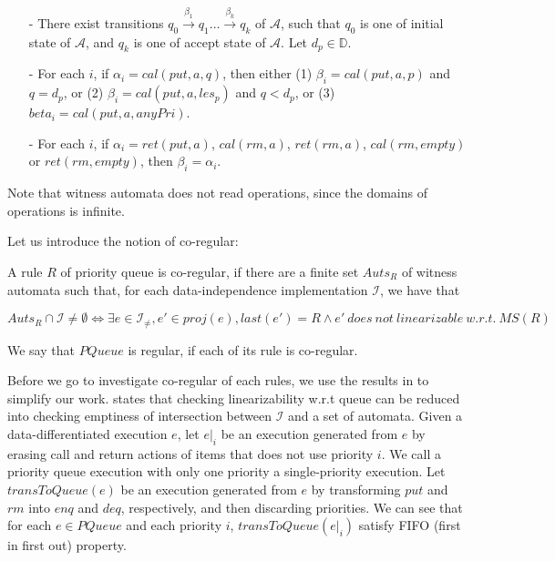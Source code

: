 \begin{itemize}
\setlength{\itemsep}{0.5pt}
\item[-] There exist transitions $q_0 \xrightarrow{\beta_1} q_1 \ldots \xrightarrow{\beta_k} q_k$ of $\mathcal{A}$, such that $q_0$ is one of initial state of $\mathcal{A}$, and $q_k$ is one of accept state of $\mathcal{A}$. Let $d_p \in \mathbb{D}$.

\item[-] For each $i$, if $\alpha_i = \textit{cal}(\textit{put},a,q)$, then either (1) $\beta_i = \textit{cal}(\textit{put},a,p)$ and $q = d_p$, or (2) $\beta_i = \textit{cal}(\textit{put},a,\textit{les}_p)$ and $q < d_p$, or (3) $beta_i = \textit{cal}(\textit{put},a,\textit{anyPri})$.

\item[-] For each $i$, if $\alpha_i = \textit{ret}(\textit{put},a)$, $\textit{cal}(\textit{rm},a)$, $\textit{ret}(\textit{rm},a)$, $\textit{cal}(\textit{rm},\textit{empty})$ or $\textit{ret}(\textit{rm},\textit{empty})$, then $\beta_i = \alpha_i$.
\end{itemize}

Note that witness automata does not read operations, since the domains of operations is infinite.

Let us introduce the notion of co-regular:

\begin{definition}\label{def:co-regular of rules of priority queues}
A rule $R$ of priority queue is co-regular, if there are a finite set $\textit{Auts}_{R}$ of witness automata such that, for each data-independence implementation $\mathcal{I}$, we have that

$$ \textit{Auts}_{R} \cap \mathcal{I} \neq \emptyset \Leftrightarrow \exists e \in \mathcal{I}_{\neq},e' \in \textit{proj}(e), last(e')=R \wedge e' \ does \ not \ linearizable \ w.r.t. \ \textit{MS}(R)$$

We say that $\textit{PQueue}$ is regular, if each of its rule is co-regular.
\end{definition}

Before we go to investigate co-regular of each rules, we use the results in \cite{Bouajjani:2015} to simplify our work. \cite{Bouajjani:2015} states that checking linearizability w.r.t queue can be reduced into checking emptiness of intersection between $\mathcal{I}$ and a set of automata. Given a data-differentiated execution $e$, let $e \vert_{i}$ be an execution generated from $e$ by erasing call and return actions of items that does not use priority $i$. We call a priority queue execution with only one priority a single-priority execution. Let $\textit{transToQueue}(e)$ be an execution generated from $e$ by transforming $\textit{put}$ and $\textit{rm}$ into $\textit{enq}$ and $\textit{deq}$, respectively, and then discarding priorities. We can see that for each $e \in \textit{PQueue}$ and each priority $i$, $\textit{transToQueue}(e \vert_{i})$ satisfy FIFO (first in first out) property.

